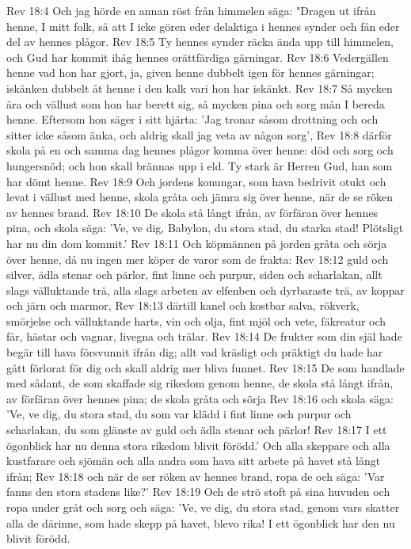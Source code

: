 Rev 18:4  Och jag hörde en annan röst från himmelen säga: "Dragen ut ifrån henne, I mitt folk, så att I icke gören eder delaktiga i hennes synder och fån eder del av hennes plågor.
Rev 18:5  Ty hennes synder räcka ända upp till himmelen, och Gud har kommit ihåg hennes orättfärdiga gärningar.
Rev 18:6  Vedergällen henne vad hon har gjort, ja, given henne dubbelt igen för hennes gärningar; iskänken dubbelt åt henne i den kalk vari hon har iskänkt.
Rev 18:7  Så mycken ära och vällust som hon har berett sig, så mycken pina och sorg mån I bereda henne. Eftersom hon säger i sitt hjärta: 'Jag tronar såsom drottning och och sitter icke såsom änka, och aldrig skall jag veta av någon sorg',
Rev 18:8  därför skola på en och samma dag hennes plågor komma över henne: död och sorg och hungersnöd; och hon skall brännas upp i eld. Ty stark är Herren Gud, han som har dömt henne.
Rev 18:9  Och jordens konungar, som hava bedrivit otukt och levat i vällust med henne, skola gråta och jämra sig över henne, när de se röken av hennes brand.
Rev 18:10  De skola stå långt ifrån, av förfäran över hennes pina, och skola säga: 'Ve, ve dig, Babylon, du stora stad, du starka stad! Plötsligt har nu din dom kommit.'
Rev 18:11  Och köpmännen på jorden gråta och sörja över henne, då nu ingen mer köper de varor som de frakta:
Rev 18:12  guld och silver, ädla stenar och pärlor, fint linne och purpur, siden och scharlakan, allt slags välluktande trä, alla slags arbeten av elfenben och dyrbaraste trä, av koppar och järn och marmor,
Rev 18:13  därtill kanel och kostbar salva, rökverk, smörjelse och välluktande harts, vin och olja, fint mjöl och vete, fäkreatur och får, hästar och vagnar, livegna och trälar.
Rev 18:14  De frukter som din själ hade begär till hava försvunnit ifrån dig; allt vad kräsligt och präktigt du hade har gått förlorat för dig och skall aldrig mer bliva funnet.
Rev 18:15  De som handlade med sådant, de som skaffade sig rikedom genom henne, de skola stå långt ifrån, av förfäran över hennes pina; de skola gråta och sörja
Rev 18:16  och skola säga: 'Ve, ve dig, du stora stad, du som var klädd i fint linne och purpur och scharlakan, du som glänste av guld och ädla stenar och pärlor!
Rev 18:17  I ett ögonblick har nu denna stora rikedom blivit förödd.' Och alla skeppare och alla kustfarare och sjömän och alla andra som hava sitt arbete på havet stå långt ifrån;
Rev 18:18  och när de ser röken av hennes brand, ropa de och säga: 'Var fanns den stora stadens like?'
Rev 18:19  Och de strö stoft på sina huvuden och ropa under gråt och sorg och säga: 'Ve, ve dig, du stora stad, genom vars skatter alla de därinne, som hade skepp på havet, blevo rika! I ett ögonblick har den nu blivit förödd.
